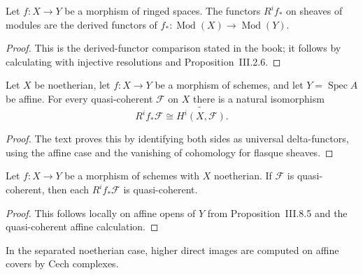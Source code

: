 \begin{proposition}\label{ha-ch3-prop-direct-image-composition}
Let $f:X\to Y$ be a morphism of ringed spaces.  The functors $R^if_*$ on
sheaves of modules are the derived functors of
$f_*:\operatorname{Mod}(X)\to\operatorname{Mod}(Y)$.
\end{proposition}
\begin{proof}

This is the derived-functor comparison stated in the book; it follows by
calculating with injective resolutions and Proposition~III.2.6.

\end{proof}
\begin{proposition}\label{ha-ch3-prop-affine-direct-image}
Let $X$ be noetherian, let $f:X\to Y$ be a morphism of schemes, and let
$Y=\operatorname{Spec}A$ be affine.  For every quasi-coherent $\mathcal F$ on
$X$ there is a natural isomorphism
\[
R^if_*\mathcal F\cong\widetilde{H^i(X,\mathcal F)}.
\]

\end{proposition}
\begin{proof}

The text proves this by identifying both sides as universal delta-functors,
using the affine case and the vanishing of cohomology for flasque sheaves.

\end{proof}
\begin{corollary}\label{ha-ch3-cor-direct-image-affine}
Let $f:X\to Y$ be a morphism of schemes with $X$ noetherian.  If
$\mathcal F$ is quasi-coherent, then each $R^if_*\mathcal F$ is
quasi-coherent.
\end{corollary}
\begin{proof}

This follows locally on affine opens of $Y$ from Proposition~III.8.5 and
the quasi-coherent affine calculation.

\end{proof}
\begin{corollary}\label{ha-ch3-cor-separated-direct-image}
In the separated noetherian case, higher direct images are computed on affine
covers by Cech complexes.

\end{corollary}

